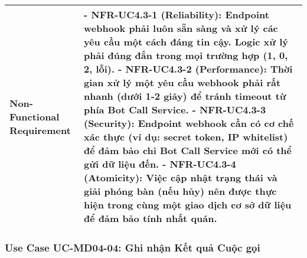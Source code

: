 \begin{longtable}{|m{4cm}|p{11cm}|}
\hline
Non-Functional Requirement & - \textbf{NFR-UC4.3-1 (Reliability):} Endpoint webhook phải luôn sẵn sàng và xử lý các yêu cầu một cách đáng tin cậy. Logic xử lý phải đúng đắn trong mọi trường hợp (1, 0, 2, lỗi). \newline - \textbf{NFR-UC4.3-2 (Performance):} Thời gian xử lý một yêu cầu webhook phải rất nhanh (dưới 1-2 giây) để tránh timeout từ phía Bot Call Service. \newline - \textbf{NFR-UC4.3-3 (Security):} Endpoint webhook cần có cơ chế xác thực (ví dụ: secret token, IP whitelist) để đảm bảo chỉ Bot Call Service mới có thể gửi dữ liệu đến. \newline - \textbf{NFR-UC4.3-4 (Atomicity):} Việc cập nhật trạng thái và giải phóng bàn (nếu hủy) nên được thực hiện trong cùng một giao dịch cơ sở dữ liệu để đảm bảo tính nhất quán. \\
\hline
\end{longtable}

\subsubsection{Use Case UC-MD04-04: Ghi nhận Kết quả Cuộc gọi}

